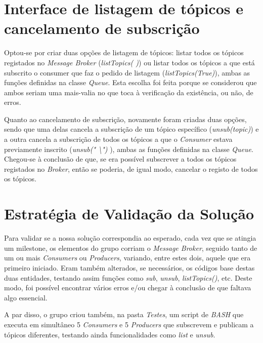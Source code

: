 \documentclass[10pt,portuguese]{article}
\begin{document}
\section{Interface de listagem de tópicos e cancelamento de subscrição}
\par Optou-se por criar duas opções de listagem de tópicos: listar todos os tópicos registados no \textit{Message Broker} (\textit{listTopics( )}) ou listar todos os tópicos a que está subscrito o consumer que faz o pedido de listagem (\textit{listTopics(True)}), ambas as funções definidas na classe \textit{Queue}. Esta escolha foi feita porque se considerou que ambos seriam uma mais-valia no que toca à verificação da existência, ou não, de erros.
\par Quanto ao cancelamento de subscrição, novamente foram criadas duas opções, sendo que uma delas cancela a subscrição de um tópico específico (\textit{unsub(topic)}) e a outra cancela a subscrição de todos os tópicos a que o \textit{Consumer} estava previamente inscrito (\textit{unsub(" {\textbackslash}") }), ambas as funções definidas na classe \textit{Queue}. Chegou-se à conclusão de que, se era possível subscrever a todos os tópicos registados no \textit{Broker}, então se poderia, de igual modo, cancelar o registo de todos os tópicos.

\section{Estratégia de Validação da Solução}
\par Para validar se a nossa solução correspondia ao esperado, cada vez que se atingia um milestone, os elementos do grupo corriam o \textit{Message Broker}, seguido tanto de um ou mais \textit{Consumers} ou \textit{Producers}, variando, entre estes dois, aquele que era primeiro iniciado. Eram também alterados, se necessários, os códigos base destas duas entidades, testando assim funções como \textit{sub}, \textit{unsub}, \textit{listTopics()}, etc. Deste modo, foi possível encontrar vários erros e/ou chegar à conclusão de que faltava algo essencial. 
\par A par disso, o grupo criou também, na pasta \textit{Testes}, um script de \textit{BASH} que executa em simultâneo 5 \textit{Consumers} e 5 \textit{Producers} que subscrevem e publicam a tópicos diferentes, testando ainda funcionalidades como \textit{list} e \textit{unsub}. 
\end{document}
